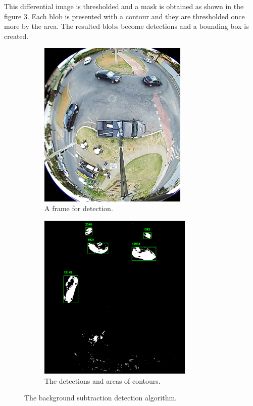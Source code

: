 \documentclass[a4paper,11pt,titlepage,twoside]{article}
\numberwithin{figure}{section}
\begin{document}
This differential image is thresholded and a mask is obtained as shown in the figure \ref{fig:mask_area}. Each blob is presented with a contour and they are thresholded once more by the area. The resulted blobs become detections and a bounding box is created.

\begin{figure}
    \begin{subfigure}[Sample1]{0.5\linewidth}
    	\includegraphics[height=80mm]{fig/frame_cropped.png} 
        \caption{A frame for detection.}
        \label{fig:frame_for_detection}   
    \end{subfigure}
    \qquad
    \begin{subfigure}[Sample1]{0.5\linewidth} 
    	\includegraphics[height=80mm]{fig/mask_area.png}
        \caption{The detections and areas of contours.}   
        \label{fig:mask_area}
    \end{subfigure} 
    \caption{The background subtraction detection algorithm.}
\end{figure}
\end{document}
